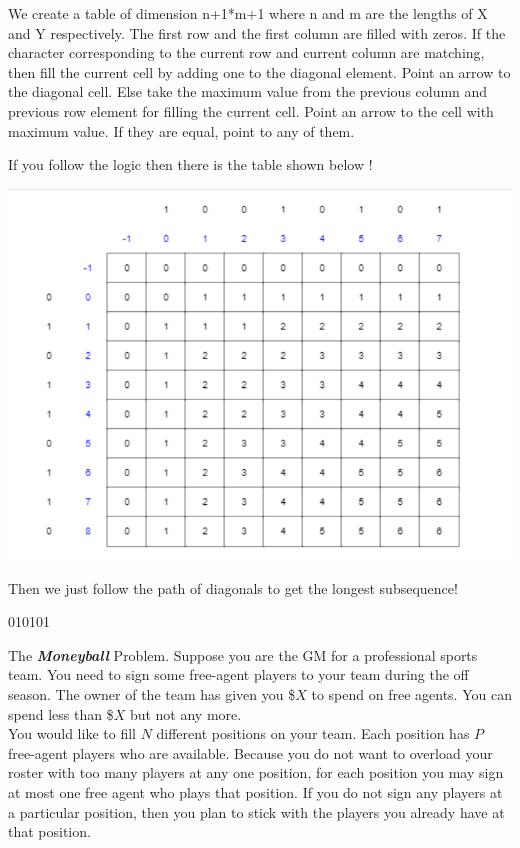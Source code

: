 \documentclass[addpoints,11pt]{exam}
\begin{document}
\begin{questions}
\begin{solutionorbox}
We create a table of dimension n+1*m+1 where n and m are the lengths of X and Y respectively. The first row and the first column are filled with zeros.
If the character corresponding to the current row and current column are matching, then fill the current cell by adding one to the diagonal element. Point an arrow to the diagonal cell.
Else take the maximum value from the previous column and previous row element for filling the current cell. Point an arrow to the cell with maximum value. If they are equal, point to any of them.

If you follow the logic then there is the table shown below ! 

\includegraphics{image.png}

Then we just follow the path of diagonals to get the longest subsequence! 

010101

\end{solutionorbox}

\ifprintanswers
\newpage
\else
\bigskip
\fi


\question[25]
The \textbf{\textit{Moneyball}} Problem.  Suppose you are the GM for a professional sports team.  You need to sign some free-agent players to your team during the off season.  The owner of the team has given you \$$X$ to spend on free agents.  You can spend less than \$$X$ but not any more.\\

You would like to fill $N$ different positions on your team.  Each position has $P$ free-agent players who are available.  Because you do not want to overload your roster with too many players at any one position, for each position you may sign at most one free agent who plays that position.  If you do not sign any players at a particular position, then you plan to stick with the players you already have at that position.\\


\end{questions}
\end{document}
